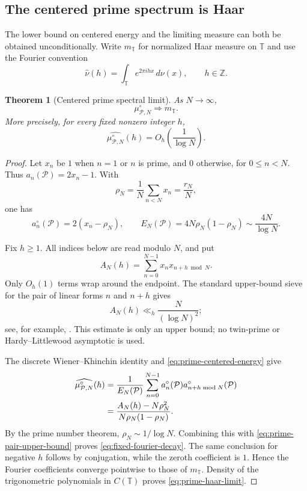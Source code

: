 \documentclass[11pt]{article}
\newtheorem{theorem}{Theorem}[section]
\theoremstyle{definition}
\theoremstyle{remark}
\newcommand{\T}{\mathbb{T}}
\newcommand{\cP}{\mathcal{P}}
\begin{document}
\subsection{The centered prime spectrum is Haar}

The lower bound on centered energy and the limiting measure can both be obtained unconditionally.  Write $m_{\T}$ for normalized Haar measure on $\T$ and use the Fourier convention
\[
    \widehat\nu(h)=\int_{\T}e^{2\pi i h x}\,d\nu(x),
    \qquad h\in\mathbb Z.
\]

\begin{theorem}[Centered prime spectral limit]\label{thm:centered-prime-haar}
As $N\to\infty$,
\begin{equation}\label{eq:prime-haar-limit}
    \mu^{\circ}_{\cP,N}\Rightarrow m_{\T}.
\end{equation}
More precisely, for every fixed nonzero integer $h$,
\begin{equation}\label{eq:fixed-fourier-decay}
    \widehat{\mu^{\circ}_{\cP,N}}(h)
    =O_h\!\left(\frac1{\log N}\right).
\end{equation}
\end{theorem}

\begin{proof}
Let $x_n$ be $1$ when $n=1$ or $n$ is prime, and $0$ otherwise, for $0\le n<N$.  Thus $a_n(\cP)=2x_n-1$.  With
\[
    \rho_N=\frac1N\sum_{n<N}x_n=\frac{r_N}{N},
\]
one has
\begin{equation}\label{eq:prime-centered-energy}
    a_n^{\circ}(\cP)=2(x_n-\rho_N),
    \qquad
    E_N(\cP)=4N\rho_N(1-\rho_N)
    \sim\frac{4N}{\log N}.
\end{equation}

Fix $h\ge1$.  All indices below are read modulo $N$, and put
\[
    A_N(h)=\sum_{n=0}^{N-1}x_nx_{n+h\bmod N}.
\]
Only $O_h(1)$ terms wrap around the endpoint.  The standard upper-bound sieve for the pair of linear forms $n$ and $n+h$ gives
\begin{equation}\label{eq:prime-pair-upper-bound}
    A_N(h)\ll_h\frac{N}{(\log N)^2};
\end{equation}
see, for example, \citet[Chapter~6]{IwaniecKowalski2004}.  This estimate is only an upper bound; no twin-prime or Hardy--Littlewood asymptotic is used.

The discrete Wiener--Khinchin identity and \eqref{eq:prime-centered-energy} give
\begin{align}
    \widehat{\mu^{\circ}_{\cP,N}}(h)
    &=\frac1{E_N(\cP)}
      \sum_{n=0}^{N-1}a_n^{\circ}(\cP)
      a_{n+h\bmod N}^{\circ}(\cP)\notag\\
    &=\frac{A_N(h)-N\rho_N^2}
      {N\rho_N(1-\rho_N)}.
    \label{eq:prime-wiener-khinchin}
\end{align}
By the prime number theorem, $\rho_N\sim1/\log N$.  Combining this with \eqref{eq:prime-pair-upper-bound} proves \eqref{eq:fixed-fourier-decay}.  The same conclusion for negative $h$ follows by conjugation, while the zeroth coefficient is $1$.  Hence the Fourier coefficients converge pointwise to those of $m_{\T}$.  Density of the trigonometric polynomials in $C(\T)$ proves \eqref{eq:prime-haar-limit}.
\end{proof}
\end{document}
